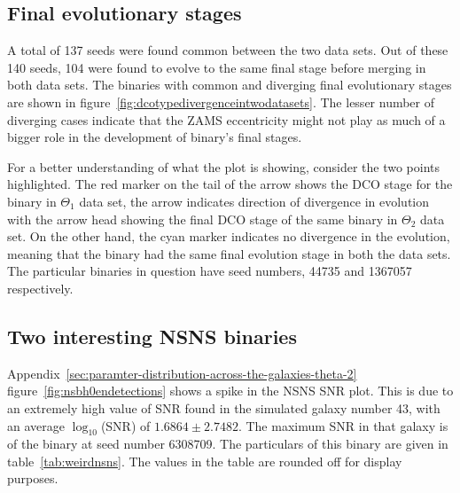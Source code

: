\documentclass[journal, twocolumns]{IEEEtran}
\begin{document}
    \subsection{Final evolutionary stages}
    \label{subsec:finalevolutionarystages}
    A total of 137 seeds were found common between the two data sets.
    Out of these 140 seeds, 104 were found to evolve to the same final stage before merging in both data sets.
    The binaries with common and diverging final evolutionary stages are shown in figure~\ref{fig:dcotypedivergenceintwodatasets}.
    The lesser number of diverging cases indicate that the ZAMS eccentricity might not play as much of a bigger role in the development of binary's final stages.

    For a better understanding of what the plot is showing, consider the two points highlighted.
    The red marker on the tail of the arrow shows the DCO stage for the binary in $\Theta_1$ data set, the arrow indicates direction of divergence in evolution with the arrow head showing the final DCO stage of the same binary in $\Theta_2$ data set. On the other hand, the cyan marker indicates no divergence in the evolution, meaning that the binary had the same final evolution stage in both the data sets. The particular binaries in question have seed numbers, 44735 and 1367057 respectively.

    \subsection{Two interesting NSNS binaries}
    \label{subsec:twointerestingnsnsbinaries}

    Appendix~\ref{sec:paramter-distribution-across-the-galaxies-theta-2} figure~\ref{fig:nsbh0endetections} shows a spike in the NSNS SNR plot. This is due to an extremely high value of SNR found in the simulated galaxy number 43, with an average $\log_{10}$(SNR) of $1.6864\pm2.7482$. The maximum SNR in that galaxy is of the binary at seed number 6308709. The particulars of this binary are given in table~\ref{tab:weirdnsns}.
    The values in the table are rounded off for display purposes.
\end{document}
